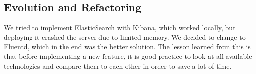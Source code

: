 \subsection{Evolution and Refactoring}

We tried to implement ElasticSearch with Kibana, which worked locally, but deploying it crashed the server due to limited memory.
We decided to change to Fluentd, which in the end was the better solution.
The lesson learned from this is that before implementing a new feature, it is good practice to look at all available technologies and compare them to each other in order to save a lot of time.
